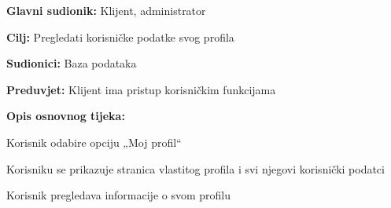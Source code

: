 						\noindent {}
						\begin{packed_item}
							
							\item \textbf{Glavni sudionik: } Klijent, administrator
							\item  \textbf{Cilj:} Pregledati korisničke podatke svog profila
							\item  \textbf{Sudionici:} Baza podataka
							\item  \textbf{Preduvjet:} Klijent ima pristup korisničkim funkcijama
							\item  \textbf{Opis osnovnog tijeka:}
							
							\item[] \begin{packed_enum}
								
								\item Korisnik odabire opciju „Moj profil“ 
								\item Korisniku se prikazuje stranica vlastitog profila i svi njegovi korisnički podatci   
								\item Korisnik pregledava informacije o svom profilu 
							 
							\end{packed_enum}
						\end{packed_item}
						\noindent {}
